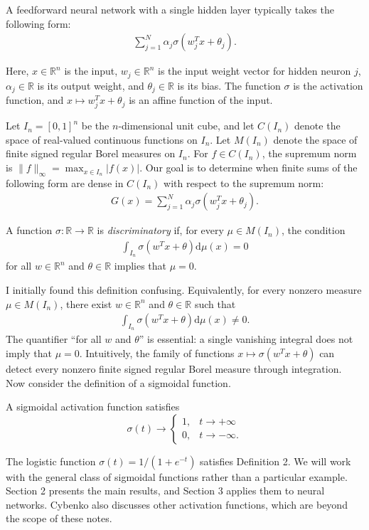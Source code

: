 \documentclass[12pt]{article}
\begin{document}
A feedforward neural network with a single hidden layer typically takes the following form:
\begin{align*}
    \sum_{j=1}^N \alpha_j \sigma (w_j^T x +\theta_j).
\end{align*}

Here, $x \in \mathbb{R}^n$ is the input, $w_j \in \mathbb{R}^n$ is the input weight vector for hidden neuron $j$, $\alpha_j \in \mathbb{R}$ is its output weight, and $\theta_j \in \mathbb{R}$ is its bias. The function $\sigma$ is the activation function, and $x \mapsto w_j^T x + \theta_j$ is an affine function of the input.

Let $I_n=[0,1]^n$ be the $n$-dimensional unit cube, and let $C(I_n)$ denote the space of real-valued continuous functions on $I_n$. Let $M(I_n)$ denote the space of finite signed regular Borel measures on $I_n$. For $f \in C(I_n)$, the supremum norm is $\lVert f\rVert_\infty=\max_{x\in I_n}|f(x)|$. Our goal is to determine when finite sums of the following form are dense in $C(I_n)$ with respect to the supremum norm:
\begin{align*}
    G(x)= \sum_{j=1}^N \alpha_j \sigma (w_j^T x +\theta_j).
\end{align*}

\begin{mydefinition}
A function $\sigma:\mathbb{R}\to\mathbb{R}$ is \emph{discriminatory} if, for every $\mu \in M(I_n)$, the condition
    \begin{align*}
        \int_{I_n} \sigma(w^Tx+\theta)\mathrm{d}\mu(x)=0
    \end{align*}
    for all $w \in \mathbb{R}^n$ and $\theta \in \mathbb{R}$ implies that $\mu = 0$.
\end{mydefinition}
I initially found this definition confusing. Equivalently, for every nonzero measure $\mu \in M(I_n)$, there exist $w \in \mathbb{R}^n$ and $\theta \in \mathbb{R}$ such that
\begin{align*}
\int_{I_n}\sigma(w^Tx+\theta)\mathrm{d}\mu(x)\neq 0.
\end{align*}
The quantifier ``for all $w$ and $\theta$'' is essential: a single vanishing integral does not imply that $\mu=0$. Intuitively, the family of functions $x\mapsto\sigma(w^Tx+\theta)$ can detect every nonzero finite signed regular Borel measure through integration. Now consider the definition of a sigmoidal function.

\begin{mydefinition}
    A sigmoidal activation function satisfies
    $$\sigma(t) \to 
    \begin{cases} 
    1, & t \to +\infty \\
    0, &  t \to -\infty.
    \end{cases}$$
\end{mydefinition}
The logistic function $\sigma(t)=1/(1+e^{-t})$ satisfies Definition 2. We will work with the general class of sigmoidal functions rather than a particular example. Section 2 presents the main results, and Section 3 applies them to neural networks. Cybenko also discusses other activation functions, which are beyond the scope of these notes.
\end{document}
